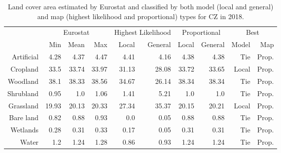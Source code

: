 \begin{table}[H]
\centering
\caption{Land cover area estimated by Eurostat and classified by both model (local and general) and map (highest likelihood and proportional) types for CZ in 2018.}

\begin{tabular}{r|rrr|rr|rr|rr}
\toprule
{} & \multicolumn{3}{|c}{Eurostat} & \multicolumn{2}{|c}{Highest Likelihood} & \multicolumn{2}{|c}{Proportional} & \multicolumn{2}{|c}{Best} \\
{} &      Min &   Mean &    Max &              Local & General &        Local & General &  Model &    Map \\
\midrule
Artificial &     4.28 &   4.37 &   4.47 &               4.41 &    4.16 &         4.38 &    4.38 &    Tie &  Prop. \\
Cropland   &     33.5 &  33.74 &  33.97 &              31.13 &   28.08 &        33.72 &   33.65 &  Local &  Prop. \\
Woodland   &     38.1 &  38.33 &  38.56 &              34.67 &   26.14 &        38.34 &   38.34 &    Tie &  Prop. \\
Shrubland  &     0.95 &    1.0 &   1.06 &               1.41 &    5.21 &          1.0 &     1.0 &    Tie &  Prop. \\
Grassland  &    19.93 &  20.13 &  20.33 &              27.34 &   35.37 &        20.15 &   20.21 &  Local &  Prop. \\
Bare land  &     0.82 &   0.88 &   0.93 &                0.0 &    0.05 &         0.88 &    0.88 &    Tie &  Prop. \\
Wetlands   &     0.28 &   0.31 &   0.33 &               0.17 &    0.05 &         0.31 &    0.31 &    Tie &  Prop. \\
Water      &      1.2 &   1.24 &   1.28 &               0.86 &    0.93 &         1.24 &    1.24 &    Tie &  Prop. \\
\bottomrule
\end{tabular}
\end{table}


